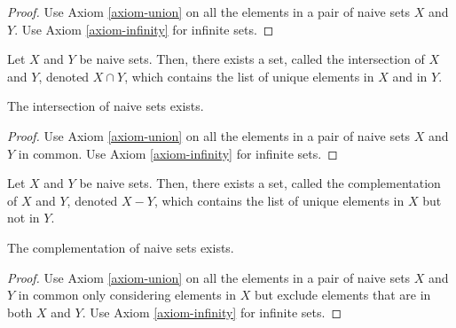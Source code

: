 \begin{proof}
	Use Axiom \ref{axiom-union} on all the elements in a pair of naive sets $X$ and $Y$. Use Axiom \ref{axiom-infinity} for infinite sets.
\end{proof}

\begin{definition}
	\label{definition-naive-set-intersection}
	Let $X$ and $Y$ be naive sets.
	Then, there exists a set, called the intersection of $X$ and $Y$, denoted $X \cap Y$, which contains the list of unique elements in $X$ and in $Y$. 
\end{definition}

\begin{lemma}
	\label{lemma-intersection-exists}
	The intersection of naive sets exists.
\end{lemma}

\begin{proof}
	Use Axiom \ref{axiom-union} on all the elements in a pair of naive sets $X$ and $Y$ in common. Use Axiom \ref{axiom-infinity} for infinite sets.
\end{proof}

\begin{definition}
	\label{definition-naive-set-complementation}
	Let $X$ and $Y$ be naive sets.
	Then, there exists a set, called the complementation of $X$ and $Y$, denoted $X - Y$, which contains the list of unique elements in $X$ but not in $Y$. 
\end{definition}

\begin{lemma}
	\label{lemma-complementation-exists}
	The complementation of naive sets exists.
\end{lemma}

\begin{proof}
	Use Axiom \ref{axiom-union} on all the elements in a pair of naive sets $X$ and $Y$ in common only considering elements in $X$ but exclude elements that are in both $X$ and $Y$. Use Axiom \ref{axiom-infinity} for infinite sets.
\end{proof}